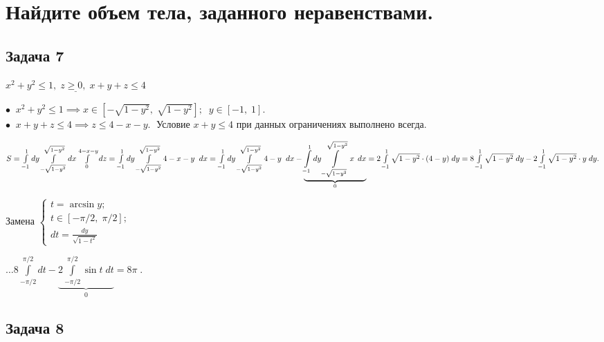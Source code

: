 \documentclass[a4paper, fleqn]{article}
\begin{document}

    \section*{Найдите объем тела, заданного неравенствами.}
    
    \subsection*{Задача 7}
    
    $\underline{x^2 + y^2 \leq 1, \; z \geq 0, \; x + y + z \leq 4}$
    
    $\bullet \; \; x^2 + y^2 \leq 1 \implies x \in \left[-\sqrt{1 - y^2}, \; \sqrt{1 - y^2}\right]; \; \; y \in [-1, \; 1].$\\
    
    $\bullet \; \; x + y + z \leq 4 \implies z \leq 4 - x - y. \; $ Условие $x + y \leq 4$ при данных ограничениях выполнено всегда.
    
    $S = \int\limits_{-1}^{1}  dy \int\limits_{-\sqrt{1 - y^2}}^{\sqrt{1 - y^2}} dx \int\limits_{0}^{4 -x - y} dz =  \int\limits_{-1}^{1}  dy \int\limits_{-\sqrt{1 - y^2}}^{\sqrt{1 - y^2}} 4 -x - y \; \;  dx =  \int\limits_{-1}^{1}  dy \int\limits_{-\sqrt{1 - y^2}}^{\sqrt{1 - y^2}} 4 - y \; \; dx -  \underbrace{\int\limits_{-1}^{1}  dy \int\limits_{-\sqrt{1 - y^2}}^{\sqrt{1 - y^2}} x \, \; dx}_{0} = \\
    2 \int\limits_{-1}^{1}  \sqrt{1 - y^2} \cdot (4 - y) \;  dy = 
    8 \int\limits_{-1}^{1}  \sqrt{1 - y^2}  \;  dy - 2 \int\limits_{-1}^{1}  \sqrt{1 - y^2} \cdot  y \;  dy .$
    
    Замена $\begin{cases}
    t = \arcsin y;\\
    t \in \left[-\pi/2 , \; \pi/2\right];\\
    dt = \frac{dy}{\sqrt{1 - t^2}}
    \end{cases}$
    
    $\dots \displaystyle 8 \int\limits_{-\pi /2}^{\pi/2} dt - \underbrace{2 \int\limits_{-\pi /2}^{\pi/2} \sin t \; dt}_{0} = \boxed{8 \pi} \; . $
    
    
    
    \subsection*{Задача 8}
    
\end{document}
